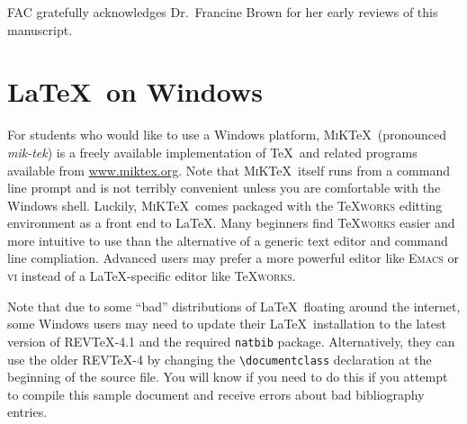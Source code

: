 \begin{acknowledgments} FAC gratefully acknowledges Dr.\ Francine Brown for
her early reviews of this manuscript.
\end{acknowledgments}





\clearpage
\appendix
\section{\LaTeX\ on Windows}
For students who would like to use a Windows platform, \textsc{MiK}\TeX\
(pronounced \emph{mik-tek}) is a freely available implementation of
\TeX\ and related programs available from \url{www.miktex.org}. Note
that \textsc{MiK}\TeX\ itself runs from a command line prompt and is not terribly
convenient unless you are comfortable with the Windows shell.  
Luckily, \textsc{MiK}\TeX\ comes packaged with the \TeX\textsc{works} 
editting environment as a front end to \LaTeX. Many beginners find 
\TeX\textsc{works} easier and more 
intuitive to use than the alternative of a generic text editor and 
command line compliation. Advanced users may prefer a more powerful 
editor like \textsc{Emacs} or \textsc{vi} instead of a \LaTeX-specific
editor like \TeX\textsc{works}.

Note that due to some ``bad'' distributions of \LaTeX\ floating around the 
internet, some Windows users may need to update their \LaTeX\ installation to 
the latest version of REV\TeX-4.1 and the required \texttt{natbib} package. 
Alternatively, they can use the older REV\TeX-4 by changing the
 \verb+\documentclass+ declaration at the beginning of the source file. 
You will know if you need to do this if you attempt to compile this sample 
document and receive errors about bad bibliography entries.

